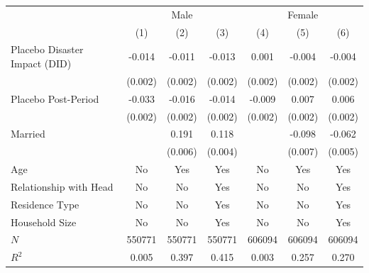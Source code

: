 \documentclass[serif, aspectratio=169]{beamer}
\begin{document}
\begin{frame}[label=employed_placebo]
\begin{table}[htbp]
\begin{tabular}{@{}l*{6}{c}@{}}
          &\multicolumn{3}{c}{Male}                                &\multicolumn{3}{c}{Female}                              \\\cmidrule(lr){2-4}\cmidrule(lr){5-7}
          &\multicolumn{1}{c}{(1)}         &\multicolumn{1}{c}{(2)}         &\multicolumn{1}{c}{(3)}         &\multicolumn{1}{c}{(4)}         &\multicolumn{1}{c}{(5)}         &\multicolumn{1}{c}{(6)}         \\
\toprule
Placebo Disaster Impact (DID)&   -0.014\sym{***}&   -0.011\sym{***}&   -0.013\sym{***}&    0.001         &   -0.004\sym{**} &   -0.004\sym{**} \\
          &  (0.002)         &  (0.002)         &  (0.002)         &  (0.002)         &  (0.002)         &  (0.002)         \\
\addlinespace
Placebo Post-Period&   -0.033\sym{***}&   -0.016\sym{***}&   -0.014\sym{***}&   -0.009\sym{***}&    0.007\sym{***}&    0.006\sym{***}\\
          &  (0.002)         &  (0.002)         &  (0.002)         &  (0.002)         &  (0.002)         &  (0.002)         \\
\addlinespace
Married   &                  &    0.191\sym{***}&    0.118\sym{***}&                  &   -0.098\sym{***}&   -0.062\sym{***}\\
          &                  &  (0.006)         &  (0.004)         &                  &  (0.007)         &  (0.005)         \\
\midrule
Age       &       No         &      Yes         &      Yes         &       No         &      Yes         &      Yes         \\
Relationship with Head&       No         &       No         &      Yes         &       No         &       No         &      Yes         \\
Residence Type&       No         &       No         &      Yes         &       No         &       No         &      Yes         \\
Household Size&       No         &       No         &      Yes         &       No         &       No         &      Yes         \\
$\textit{N}$&   550771         &   550771         &   550771         &   606094         &   606094         &   606094         \\
$\textit{R}^2$&    0.005         &    0.397         &    0.415         &    0.003         &    0.257         &    0.270         \\

\end{tabular}
\end{table}
\end{frame}
\end{document}
